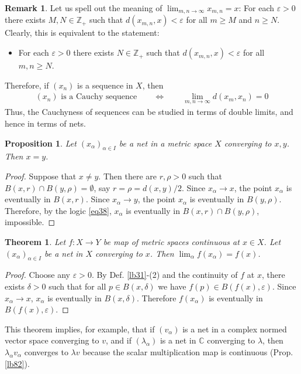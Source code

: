 \documentclass[12pt,b5paper,notitlepage]{article}
\theoremstyle{definition}
\newtheorem{rem}[df]{Remark}
\theoremstyle{plain}
\newtheorem{thm}[df]{Theorem}
\newtheorem{pp}[df]{Proposition}
\newcommand{\Cbb}{\mathbb C}
\newcommand{\Zbb}{\mathbb Z}
\newcommand{\dps}{\displaystyle}
\newcommand{\eps}{\varepsilon}
\numberwithin{equation}{section}
\begin{document}
\begin{rem}
Let us spell out the meaning of $\lim_{m,n\rightarrow\infty} x_{m,n}=x$: For each $\eps>0$ there exists $M,N\in\Zbb_+$ such that $d(x_{m,n},x)<\eps$ for all $m\geq M$ and $n\geq N$. Clearly, this is equivalent to the statement:
\begin{itemize}
\item For each $\eps>0$ there exists $N\in\Zbb_+$ such that $d(x_{m,n},x)<\eps$ for all $m,n\geq N$.
\end{itemize}
Therefore, if $(x_n)$ is a sequence in $X$, then
\begin{align}
\text{$(x_n)$ is a Cauchy sequence}\qquad\Longleftrightarrow\qquad \lim_{m,n\rightarrow\infty} d(x_m,x_n)=0
\end{align}
Thus, the Cauchyness of sequences can be studied in terms of double limits, and hence in terms of nets.
\end{rem}




\begin{pp}
Let $(x_\alpha)_{\alpha\in I}$ be a net in a metric space $X$ converging to $x,y$. Then $x=y$.
\end{pp}

\begin{proof}
Suppose that $x\neq y$. Then there are $r,\rho>0$ such that $B(x,r)\cap B(y,\rho)=\emptyset$, say $r=\rho=d(x,y)/2$. Since $x_\alpha\rightarrow x$, the point $x_\alpha$ is eventually in $B(x,r)$. Since $x_\alpha\rightarrow y$, the point $x_\alpha$ is eventually in $B(y,\rho)$. Therefore, by the logic \eqref{eq38}, $x_\alpha$ is eventually in $B(x,r)\cap B(y,\rho)$, impossible.
\end{proof}

\begin{thm}\label{lb121}
Let $f:X\rightarrow Y$ be map of metric spaces continuous at $x\in X$. Let $(x_\alpha)_{\alpha\in I}$ be a net in $X$ converging to $x$. Then  $\dps\lim_\alpha f(x_\alpha)=f(x)$.
\end{thm}

\begin{proof}
Choose any $\eps>0$. By Def. \ref{lb31}-(2) and the continuity of $f$ at $x$, there exists $\delta>0$ such that for all $p\in B(x,\delta)$ we have $f(p)\in B(f(x),\eps)$. Since $x_\alpha\rightarrow x$, $x_\alpha$ is eventually in $B(x,\delta)$. Therefore $f(x_\alpha)$ is eventually in $B(f(x),\eps)$.
\end{proof}


This theorem implies, for example, that if $(v_\alpha)$ is a net in a complex normed vector space converging to $v$, and if $(\lambda_\alpha)$ is a net in $\Cbb$ converging to $\lambda$, then $\lambda_\alpha v_\alpha$ converges to $\lambda v$ because the scalar multiplication map is continuous (Prop. \ref{lb82}).
\end{document}
